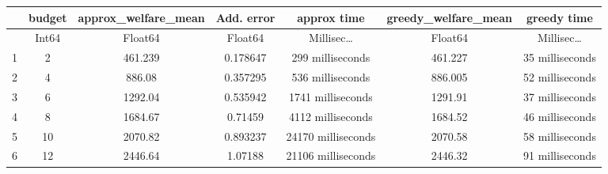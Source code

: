 \begin{tabular}{r|cccccc}
	& budget & approx\_welfare\_mean & Add. error & approx time & greedy\_welfare\_mean & greedy time\\
	\hline
	& Int64 & Float64 & Float64 & Millisec… & Float64 & Millisec…\\
	\hline
	1 & 2 & 461.239 & 0.178647 & 299 milliseconds & 461.227 & 35 milliseconds \\
	2 & 4 & 886.08 & 0.357295 & 536 milliseconds & 886.005 & 52 milliseconds \\
	3 & 6 & 1292.04 & 0.535942 & 1741 milliseconds & 1291.91 & 37 milliseconds \\
	4 & 8 & 1684.67 & 0.71459 & 4112 milliseconds & 1684.52 & 46 milliseconds \\
	5 & 10 & 2070.82 & 0.893237 & 24170 milliseconds & 2070.58 & 58 milliseconds \\
	6 & 12 & 2446.64 & 1.07188 & 21106 milliseconds & 2446.32 & 91 milliseconds \\
\end{tabular}
